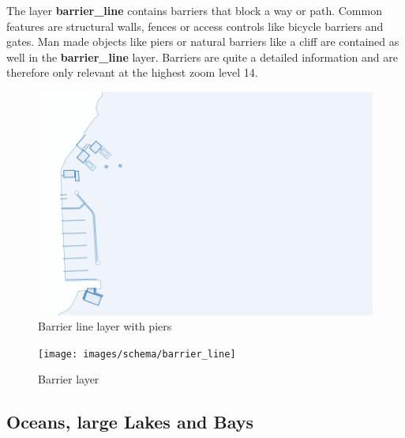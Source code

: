 \noindent\begin{minipage}[t]{0.48\linewidth}
    \vspace{0pt}
    The layer \textbf{barrier\_line} contains barriers that block a way or path. Common features are structural walls, fences or access controls like bicycle barriers and gates. Man made objects like piers or natural barriers like a cliff are contained as well in the \textbf{barrier\_line} layer. Barriers are quite a detailed information and are therefore only relevant at the highest zoom level 14.
\end{minipage}
\hfill
\begin{minipage}[t]{0.48\linewidth}
    \begin{figure}[H]
      \includegraphics[width=1\textwidth]{images/schema/piers_example}
      \caption{Barrier line layer with piers}
    \end{figure}
\end{minipage}

\begin{figure}[H]
  \centering
  \texttt{[image: images/schema/barrier\_line]}
  \caption{Barrier layer}
\end{figure}

\subsection{Oceans, large Lakes and Bays}


